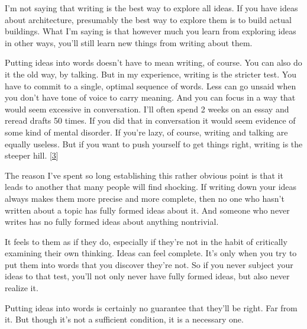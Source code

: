 I'm not saying that writing is the best
                  way to explore all ideas. If you have ideas about
                  architecture, presumably the best way to explore them is to
                  build actual buildings. What I'm saying is that however much
                  you learn from exploring ideas in other ways, you'll still
                  learn new things from writing about them.

Putting
                  ideas into words doesn't have to mean writing, of course. You
                  can also do it the old way, by talking. But in my experience,
                  writing is the stricter test. You have to commit to a single,
                  optimal sequence of words. Less can go unsaid when you don't
                  have tone of voice to carry meaning. And you can focus in a
                  way that would seem excessive in conversation. I'll often
                  spend 2 weeks on an essay and reread drafts 50 times. If you
                  did that in conversation it would seem evidence of some kind
                  of mental disorder. If you're lazy, of course, writing and
                  talking are equally useless. But if you want to push yourself
                  to get things right, writing is the steeper hill.
                  [\href{\#f3n}{3}]

The reason I've spent so long establishing this
                  rather obvious point is that it leads to another that many
                  people will find shocking. If writing down your ideas always
                  makes them more precise and more complete, then no one who
                  hasn't written about a topic has fully formed ideas about it.
                  And someone who never writes has no fully formed ideas about
                  anything nontrivial.

It feels to them as if they
                  do, especially if they're not in the habit of critically
                  examining their own thinking. Ideas can feel complete. It's
                  only when you try to put them into words that you discover
                  they're not. So if you never subject your ideas to that test,
                  you'll not only never have fully formed ideas, but also never
                  realize it.

Putting ideas into words is certainly
                  no guarantee that they'll be right. Far from it. But though
                  it's not a sufficient condition, it is a necessary one.









